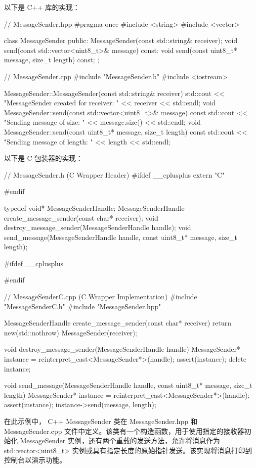 以下是 C++ 库的实现：

\begin{cpp}
// MessageSender.hpp
#pragma once
#include <string>
#include <vector>

class MessageSender {
public:
    MessageSender(const std::string& receiver);
    void send(const std::vector<uint8_t>& message) const;
    void send(const uint8_t* message, size_t length) const;
};

// MessageSender.cpp
#include "MessageSender.h"
#include <iostream>

MessageSender::MessageSender(const std::string& receiver) {
    std::cout << "MessageSender created for receiver: " << receiver <<
std::endl;
}
void MessageSender::send(const std::vector<uint8_t>& message) const {
    std::cout << "Sending message of size: " << message.size() <<
std::endl;
}
void MessageSender::send(const uint8_t* message, size_t length) const
{
    std::cout << "Sending message of length: " << length << std::endl;
}
\end{cpp}

以下是 C 包装器的实现：

\begin{cpp}
// MessageSender.h (C Wrapper Header)
#ifdef __cplusplus
extern "C" {
#endif

typedef void* MessageSenderHandle;
MessageSenderHandle create_message_sender(const char* receiver);
void destroy_message_sender(MessageSenderHandle handle);
void send_message(MessageSenderHandle handle, const uint8_t* message, size_t length);

#ifdef __cplusplus
}
#endif

// MessageSenderC.cpp (C Wrapper Implementation)
#include "MessageSenderC.h"
#include "MessageSender.hpp"

MessageSenderHandle create_message_sender(const char* receiver) {
    return new(std::nothrow) MessageSender(receiver);
}

void destroy_message_sender(MessageSenderHandle handle) {
    MessageSender* instance = reinterpret_cast<MessageSender*>(handle);
    assert(instance);
    delete instance;
}

void send_message(MessageSenderHandle handle, const uint8_t* message, size_t length) {
    MessageSender* instance = reinterpret_cast<MessageSender*>(handle);
    assert(instance);
    instance->send(message, length);
}
\end{cpp}

在此示例中， C++ MessageSender 类在 MessageSender.hpp 和 MessageSender.cpp 文件中定义。该类有一个构造函数，用于使用指定的接收器初始化 MessageSender 实例，还有两个重载的发送方法，允许将消息作为 std::vector<uint8\_t> 实例或具有指定长度的原始指针发送。该实现将消息打印到控制台以演示功能。

